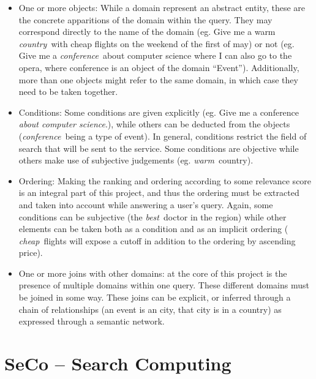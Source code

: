 \begin{itemize}

  \item One or more objects: While a domain represent an abstract entity, these are the concrete apparitions of the domain within the query. They may correspond directly to the name of the domain (eg. Give me a warm \emph{country}\ with cheap flights on the weekend of the first of may) or not (eg. Give me a \emph{conference}\ about computer science where I can also go to the opera, where conference is an object of the domain ``Event''). Additionally, more than one objects might refer to the same domain, in which case they need to be taken together.

  \item Conditions: Some conditions are given explicitly (eg. Give me a conference \emph{about computer science}.), while others can be deducted from the objects (\emph{conference}\ being a type of event). In general, conditions restrict the field of search that will be sent to the service. Some conditions are objective while others make use of subjective judgements (eg. \emph{warm}\ country).

  \item Ordering: Making the ranking and ordering according to some relevance score is an integral part of this project, and thus the ordering must be extracted and taken into account while answering a user's query. Again, some conditions can be subjective (the \emph{best}\ doctor in the region) while other elements can be taken both as a condition and as an implicit ordering ( \emph{cheap}\ flights will expose a cutoff in addition to the ordering by ascending price).

  \item One or more joins with other domains: at the core of this project is the presence of multiple domains within one query. These different domains must be joined in some way. These joins can be explicit, or inferred through a chain of relationships (an event is an city, that city is in a country) as expressed through a semantic network.

\end{itemize}





\section{SeCo -- Search Computing}

